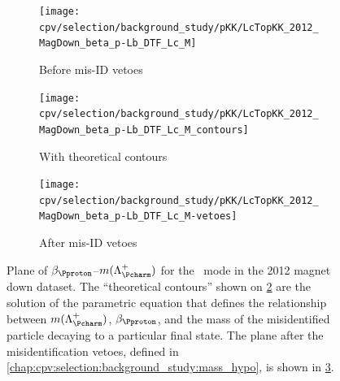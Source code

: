 \begin{figure}
  \begin{subfigure}[b]{0.5\textwidth}
    \texttt{[image: cpv/selection/background\_study/pKK/LcTopKK\_2012\_MagDown\_beta\_p-Lb\_DTF\_Lc\_M]}
    \caption{Before mis-ID vetoes}
    \label{fig:cpv:selection:background_study:mom_asym:pKK:before}
  \end{subfigure}
  \begin{subfigure}[b]{0.5\textwidth}
    \texttt{[image: cpv/selection/background\_study/pKK/LcTopKK\_2012\_MagDown\_beta\_p-Lb\_DTF\_Lc\_M\_contours]}
    \caption{With theoretical contours}
    \label{fig:cpv:selection:background_study:mom_asym:pKK:contours}
  \end{subfigure}
  \begin{subfigure}[b]{0.5\textwidth}
    \texttt{[image: cpv/selection/background\_study/pKK/LcTopKK\_2012\_MagDown\_beta\_p-Lb\_DTF\_Lc\_M-vetoes]}
    \caption{After mis-ID vetoes}
    \label{fig:cpv:selection:background_study:mom_asym:pKK:after}
  \end{subfigure}
  \caption{%
    Plane of $\beta_{\Pproton}$--$m(\PLambdac)$ for the \pKK\ mode in the 2012
    magnet down dataset.
    The ``theoretical contours'' shown on
    \cref{fig:cpv:selection:background_study:mom_asym:pKK:contours} are the
    solution of the parametric equation that defines the relationship between
    $m(\PLambdac)$, $\beta_{\Pproton}$, and the mass of the misidentified
    particle decaying to a particular final state.
    The plane after the misidentification vetoes, defined in
    \cref{chap:cpv:selection:background_study:mass_hypo}, is shown in
    \cref{fig:cpv:selection:background_study:mom_asym:pKK:after}.
  }
  \label{fig:cpv:selection:background_study:mom_asym:pKK}
\end{figure}

